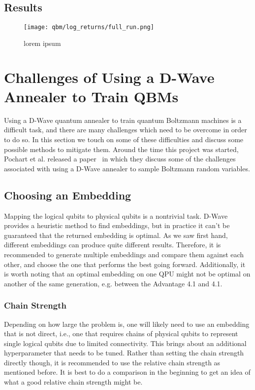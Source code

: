 \subsection{Results}
\begin{figure}[!htb]
    \begin{center}
        \texttt{[image: qbm/log\_returns/full\_run.png]}
    \end{center}
    \caption{lorem ipsum}
    \label{fig:qbm_log_returns_full_run}
\end{figure}

\section{Challenges of Using a D-Wave Annealer to Train QBMs}
Using a D-Wave quantum annealer to train quantum Boltzmann machines is a difficult task, and there are many challenges which need to be overcome in order to do so.
In this section we touch on some of these difficulties and discuss some possible methods to mitigate them.
Around the time this project was started, Pochart et al. released a paper~\cite{pochart_2021} in which they discuss some of the challenges associated with using a D-Wave annealer to sample Boltzmann random variables.

\subsection{Choosing an Embedding}
Mapping the logical qubits to physical qubits is a nontrivial task.
D-Wave provides a heuristic method to find embeddings, but in practice it can't be guaranteed that the returned embedding is optimal.
As we saw first hand, different embeddings can produce quite different results.
Therefore, it is recommended to generate multiple embeddings and compare them against each other, and choose the one that performs the best going forward.
Additionally, it is worth noting that an optimal embedding on one QPU might not be optimal on another of the same generation, e.g. between the Advantage 4.1 and 4.1.

\subsubsection{Chain Strength}
Depending on how large the problem is, one will likely need to use an embedding that is not direct, i.e., one that requires chains of physical qubits to represent single logical qubits due to limited connectivity.
This brings about an additional hyperparameter that needs to be tuned.
Rather than setting the chain strength directly though, it is recommended to use the relative chain strength as mentioned before.
It is best to do a comparison in the beginning to get an idea of what a good relative chain strength might be.

